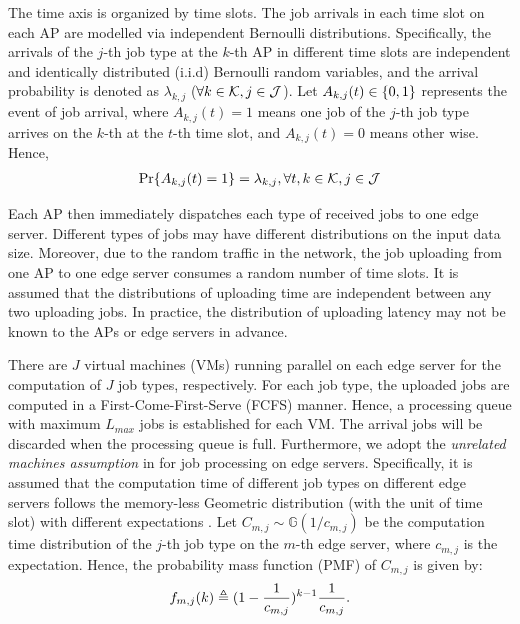 The time axis is organized by time slots.
The job arrivals in each time slot on each AP are modelled via independent Bernoulli distributions.
Specifically, the arrivals of the $j$-th job type at the $k$-th AP in different time slots are independent and identically distributed (i.i.d) Bernoulli random variables, and the arrival probability is denoted as $\lambda_{k,j}$ ($\forall k\in\mathcal{K}, j\in\mathcal{J}$).
Let $A_{k,j}(t) \in \{0,1\}$ represents the event of job arrival, where $A_{k,j}(t)=1$ means one job of the $j$-th job type arrives on the $k$-th at the $t$-th time slot, and $A_{k,j}(t)=0$ means other wise.
Hence,
\begin{align}
    \Pr\{ A_{k,j}(t) = 1 \} = \lambda_{k,j}, \forall t,k\in\mathcal{K},j\in\mathcal{J}
\end{align}

Each AP then immediately dispatches each type of received jobs to one edge server.
Different types of jobs may have different distributions on the input data size.
Moreover, due to the random traffic in the network, the job uploading from one AP to one edge server consumes a random number of time slots.
It is assumed that the distributions of uploading time are independent between any two uploading jobs.
In practice, the distribution of uploading latency may not be known to the APs or edge servers in advance.

There are $J$ virtual machines (VMs) running parallel on each edge server for the computation of $J$ job types, respectively.
For each job type, the uploaded jobs are computed in a First-Come-First-Serve (FCFS) manner.
Hence, a processing queue with maximum $L_{max}$ jobs is established for each VM.
The arrival jobs will be discarded when the processing queue is full.
Furthermore, we adopt the \emph{unrelated machines assumption} in \cite{tan-online} for job processing on edge servers.
Specifically, it is assumed that the computation time of different job types on different edge servers follows the memory-less Geometric distribution (with the unit of time slot) with different expectations \cite{TOWC18-HuangKb}.
Let $C_{m,j} \sim \mathbb{G}(1/c_{m,j})$ be the computation time distribution of the $j$-th job type on the $m$-th edge server, where $c_{m,j}$ is the expectation.
Hence, the probability mass function (PMF) of $C_{m,j}$ is given by:
\begin{align}
    f_{m,j}(k) \triangleq (1-\frac{1}{c_{m,j}})^{k-1} \frac{1}{c_{m,j}}.
\end{align}

